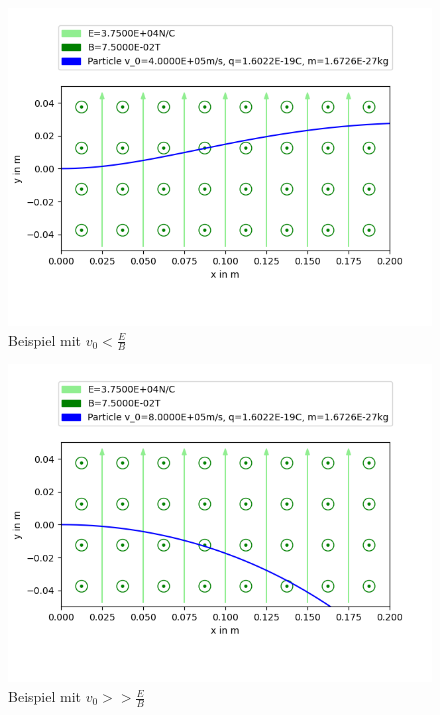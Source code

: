 \documentclass[german, a4paper, 10pt]{article}
\begin{document}
\begin{figure}[ht]
\caption{Beispiel mit $v_0<\frac{E}{B}$}
\centering
\includegraphics[width=\textwidth]{figure_2}
\end{figure}
\begin{figure}[ht]
\caption{Beispiel mit $v_0>>\frac{E}{B}$}
\centering
\includegraphics[width=\textwidth]{figure_4}
\end{figure}
\end{document}
